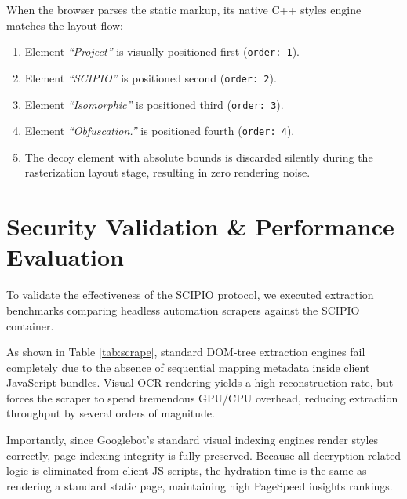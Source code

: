 \documentclass[10pt,journal,compsoc]{IEEEtran}
\begin{document}
When the browser parses the static markup, its native C++ styles engine matches the layout flow:
\begin{enumerate}
    \item Element \emph{``Project''} is visually positioned first (\texttt{order: 1}).
    \item Element \emph{``SCIPIO''} is positioned second (\texttt{order: 2}).
    \item Element \emph{``Isomorphic''} is positioned third (\texttt{order: 3}).
    \item Element \emph{``Obfuscation.''} is positioned fourth (\texttt{order: 4}).
    \item The decoy element with absolute bounds is discarded silently during the rasterization layout stage, resulting in zero rendering noise.
\end{enumerate}

\section{Security Validation \& Performance Evaluation}
To validate the effectiveness of the SCIPIO protocol, we executed extraction benchmarks comparing headless automation scrapers against the SCIPIO container. 

As shown in Table \ref{tab:scrape}, standard DOM-tree extraction engines fail completely due to the absence of sequential mapping metadata inside client JavaScript bundles. Visual OCR rendering yields a high reconstruction rate, but forces the scraper to spend tremendous GPU/CPU overhead, reducing extraction throughput by several orders of magnitude. 

Importantly, since Googlebot's standard visual indexing engines render styles correctly, page indexing integrity is fully preserved. Because all decryption-related logic is eliminated from client JS scripts, the hydration time is the same as rendering a standard static page, maintaining high PageSpeed insights rankings.

\begin{table}[b!]
    \centering
    \vspace{1.5ex}
    \caption{Scraping Methods extraction baseline metrics under SCIPIO}
    \label{tab:scrape}
\end{table}
\end{document}
